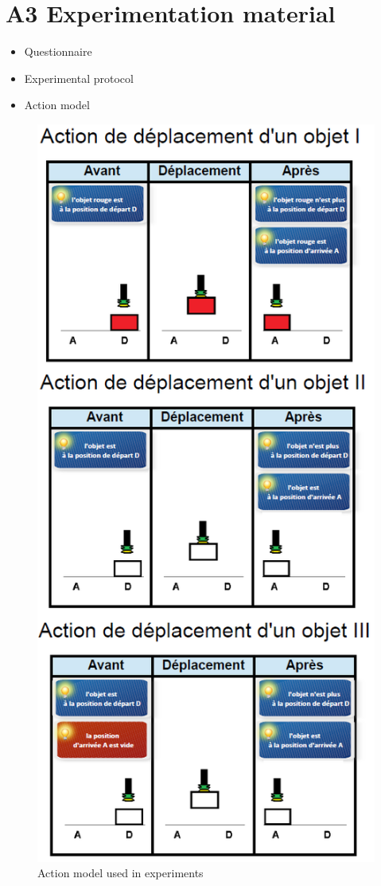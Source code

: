 \chapter{A3 Experimentation material}\label{Experimentation material}\label{Action Model}\label{Questionnaire}
\begin{itemize}
\item Questionnaire
\item Experimental protocol
\item Action model
\end{itemize}
  \begin{figure}[h]
    \centering
    \includegraphics[scale=0.7]{figures/schema-all}
    \caption{Action model used in experiments}
    \label{fig:schema-all}
  \end{figure}
